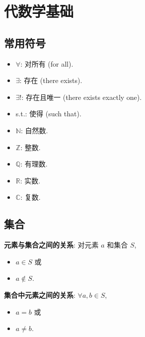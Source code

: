 \documentclass{note}
\begin{document}
\setcounter{chapter}{-1}
\fi
\chapter{代数学基础}
\section{常用符号}
\begin{itemize}
    \item $\forall$: 对所有 (for all).
    \item $\exists$: 存在 (there exists).
    \item $\exists!$: 存在且唯一 (there exists exactly one).
    \item s.t.: 使得 (such that).
    \item $\mathbb{N}$: 自然数.
    \item $\mathbb{Z}$: 整数.
    \item $\mathbb{Q}$: 有理数.
    \item $\mathbb{R}$: 实数.
    \item $\mathbb{C}$: 复数.
\end{itemize}

\section{集合}
\begin{df}[集合 (Set)]
\end{df}

\textbf{元素与集合之间的关系}: 对元素 $a$ 和集合 $S$,
\begin{itemize}
    \item $a\in S$ 或
    \item $a\notin S$.
\end{itemize}

\textbf{集合中元素之间的关系}: $\forall a,b\in S$,
\begin{itemize}
    \item $a=b$ 或
    \item $a\neq b$.
\end{itemize}
\end{document}
